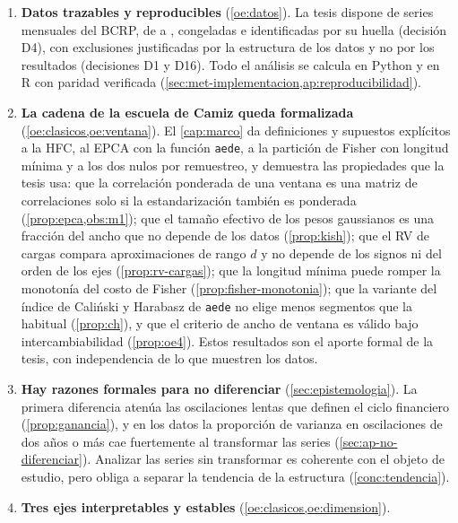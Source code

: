 \begin{enumerate}[label=\textbf{C\arabic*.}, ref=C\arabic*, leftmargin=*]
  \item\label{conc:datos} \textbf{Datos trazables y reproducibles} (\cref{oe:datos}). La tesis
    dispone de \nSeries{} series mensuales del BCRP, de \fechaInicioNiveles{} a \fechaFinDatos{},
    congeladas e identificadas por su huella (decisión D4), con exclusiones justificadas por la
    estructura de los datos y no por los resultados (decisiones D1 y D16). Todo el análisis se
    calcula en Python y en R con paridad verificada (\cref{sec:met-implementacion,ap:reproducibilidad}).
  \item\label{conc:formal} \textbf{La cadena de la escuela de Camiz queda formalizada}
    (\cref{oe:clasicos,oe:ventana}). El \cref{cap:marco} da definiciones y supuestos explícitos a
    la HFC, al EPCA con la función \texttt{aede}, a la partición de Fisher con longitud mínima y a
    los dos nulos por remuestreo, y demuestra las propiedades que la tesis usa: que la correlación
    ponderada de una ventana es una matriz de correlaciones solo si la estandarización también es
    ponderada (\cref{prop:epca,obs:m1}); que el tamaño efectivo de los pesos gaussianos es una
    fracción del ancho que no depende de los datos (\cref{prop:kish}); que el RV de cargas compara
    aproximaciones de rango $d$ y no depende de los signos ni del orden de los ejes
    (\cref{prop:rv-cargas}); que la longitud mínima puede romper la monotonía del costo de Fisher
    (\cref{prop:fisher-monotonia}); que la variante del índice de Caliński y Harabasz de
    \texttt{aede} no elige menos segmentos que la habitual (\cref{prop:ch}), y que el criterio
    de ancho de ventana es válido bajo intercambiabilidad (\cref{prop:oe4}). Estos resultados son
    el aporte formal de la tesis, con independencia de lo que muestren los datos.
  \item\label{conc:niveles} \textbf{Hay razones formales para no diferenciar}
    (\cref{sec:epistemologia}). La primera diferencia atenúa las oscilaciones lentas que definen el
    ciclo financiero (\cref{prop:ganancia}), y en los datos la proporción de varianza en
    oscilaciones de dos años o más cae fuertemente al transformar las series
    (\cref{sec:ap-no-diferenciar}). Analizar las series sin transformar es coherente con el objeto
    de estudio, pero obliga a separar la tendencia de la estructura (\ref{conc:tendencia}).
  \item\label{conc:pca} \textbf{Tres ejes interpretables y estables} (\cref{oe:clasicos,oe:dimension}).

\end{enumerate}
